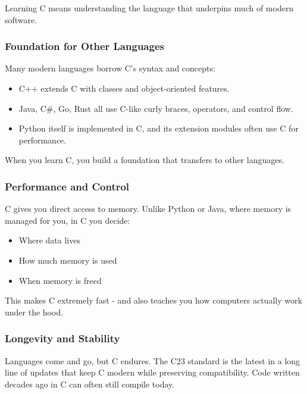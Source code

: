 \documentclass[
  letterpaper,
  DIV=11,
  numbers=noendperiod]{scrreprt}
\providecommand{\tightlist}{%
  \setlength{\itemsep}{0pt}\setlength{\parskip}{0pt}}
\begin{document}
Learning C means understanding the language that underpins much of
modern software.

\subsubsection{Foundation for Other
Languages}\label{foundation-for-other-languages}

Many modern languages borrow C's syntax and concepts:

\begin{itemize}
\tightlist
\item
  C++ extends C with classes and object-oriented features.
\item
  Java, C\#, Go, Rust all use C-like curly braces, operators, and
  control flow.
\item
  Python itself is implemented in C, and its extension modules often use
  C for performance.
\end{itemize}

When you learn C, you build a foundation that transfers to other
languages.

\subsubsection{Performance and Control}\label{performance-and-control}

C gives you direct access to memory. Unlike Python or Java, where memory
is managed for you, in C you decide:

\begin{itemize}
\tightlist
\item
  Where data lives
\item
  How much memory is used
\item
  When memory is freed
\end{itemize}

This makes C extremely fast - and also teaches you how computers
actually work under the hood.

\subsubsection{Longevity and Stability}\label{longevity-and-stability}

Languages come and go, but C endures. The C23 standard is the latest in
a long line of updates that keep C modern while preserving
compatibility. Code written decades ago in C can often still compile
today.
\end{document}
